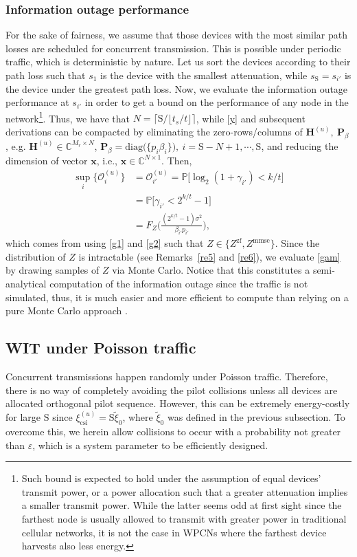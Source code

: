 \documentclass[10pt,journal,a4paper]{IEEEtran}
\begin{document}
	\subsubsection{Information outage performance}
	For the sake of fairness, we assume that those devices with the most similar path losses are scheduled for concurrent transmission. This is possible under periodic traffic, which is deterministic by nature. Let us sort the devices according to their path loss such that $s_1$ is the device with the smallest attenuation, while $s_\mathrm{S}=s_{i'}$ is the device under the greatest path loss. Now, we evaluate the information outage performance at $s_{i'}$ in order to get a bound on the performance of any node in the network\footnote{Such bound is expected to hold under the assumption of equal devices' transmit power, or a power allocation such that a greater attenuation implies a smaller transmit power. While the latter seems odd at first sight since the farthest node is usually allowed to transmit with greater power in traditional cellular networks, it is not the case in WPCNs where the farthest device harvests also less energy.}. Thus, we have that $N=\lceil\mathrm{S}/\lfloor t_s/t\rfloor\rceil$, while \eqref{y} and subsequent derivations can be compacted by eliminating the zero-rows/columns of $\mathbf{H}^{(u)},\ \mathbf{P}_\beta$, e.g. $\mathbf{H}^{(u)}\in \mathbb{C}^{M_r\times N}$, $\mathbf{P}_\beta=\mathrm{diag}\big(\{p_i\beta_i\}\big),\ i\!=\!\mathrm{S}\!-\!N\!+\!1,\cdots,\mathrm{S}$, and reducing the dimension of vector $\mathbf{x}$, i.e., $\mathbf{x}\in \mathbb{C}^{N\times 1}$.  Then,
	\begin{align}
	\sup_i\{\mathcal{O}_i^{(u)}\}&= \mathcal{O}_{i'}^{(u)}=\mathbb{P}\big[\log_2(1+\gamma_{i'})<k/t\big]\nonumber\\
	&=\mathbb{P}\big[\gamma_{i'}<2^{k/t}-1\big]\nonumber\\
	&=F_Z\bigg(\frac{(2^{k/t}-1)\sigma^2}{\beta_{i'}p_{i'}}\bigg),\label{gam}
	\end{align}
	which comes from using \eqref{g1} and \eqref{g2} such that $Z\in\{Z^\mathrm{zf},Z^\mathrm{mmse}\}$. Since the distribution of $Z$ is intractable (see Remarks~\ref{re5} and \ref{re6}), we evaluate \eqref{gam} by drawing samples of $Z$ via Monte Carlo. Notice that this constitutes a semi-analytical computation of the information outage since the traffic is not simulated, thus, it is much easier and more efficient to compute than relying on a pure Monte Carlo approach \cite{Rubinstein.2016}.
	\subsection{WIT under Poisson traffic}\label{Poisson}
	Concurrent transmissions happen randomly under Poisson traffic. Therefore, there is no way of completely avoiding  the pilot collisions unless all devices are allocated orthogonal pilot sequence. However, this can be extremely energy-costly for large $\mathrm{S}$ since $\xi_\mathrm{csi}^{(u)}=\mathrm{S}\tilde{\xi}_0$, where $\tilde{\xi}_0$ was defined in the previous subsection. To overcome this, we herein allow collisions to occur with a probability not greater than $\varepsilon$, which is a system parameter to be efficiently designed.
\end{document}
